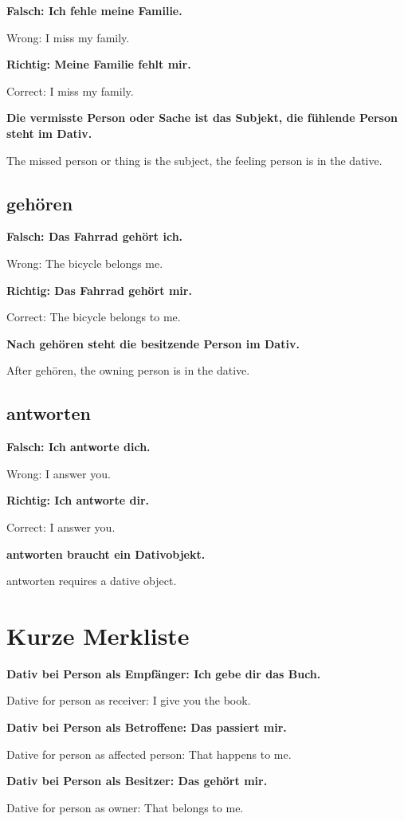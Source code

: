 \documentclass[a4paper]{article}
\newcommand{\EN}[1]{\par{\small\textcolor{TranslationGray}{#1}}\vspace{0.4em}}
\begin{document}
            \textbf{Falsch: Ich fehle meine Familie.}
            \EN{Wrong: I miss my family.}
            
            \textbf{Richtig: Meine Familie fehlt mir.}
            \EN{Correct: I miss my family.}
            
            \textbf{Die vermisste Person oder Sache ist das Subjekt, die fühlende Person steht im Dativ.}
            \EN{The missed person or thing is the subject, the feeling person is in the dative.}
        
        \subsection{gehören}
            
            \textbf{Falsch: Das Fahrrad gehört ich.}
            \EN{Wrong: The bicycle belongs me.}
            
            \textbf{Richtig: Das Fahrrad gehört mir.}
            \EN{Correct: The bicycle belongs to me.}
            
            \textbf{Nach gehören steht die besitzende Person im Dativ.}
            \EN{After gehören, the owning person is in the dative.}
        
        \subsection{antworten}
            
            \textbf{Falsch: Ich antworte dich.}
            \EN{Wrong: I answer you.}
            
            \textbf{Richtig: Ich antworte dir.}
            \EN{Correct: I answer you.}
            
            \textbf{antworten braucht ein Dativobjekt.}
            \EN{antworten requires a dative object.}
    
    
    \section{Kurze Merkliste}
        
        \textbf{Dativ bei Person als Empfänger: Ich gebe dir das Buch.}
        \EN{Dative for person as receiver: I give you the book.}
        
        \textbf{Dativ bei Person als Betroffene: Das passiert mir.}
        \EN{Dative for person as affected person: That happens to me.}
        
        \textbf{Dativ bei Person als Besitzer: Das gehört mir.}
        \EN{Dative for person as owner: That belongs to me.}
        
\end{document}
